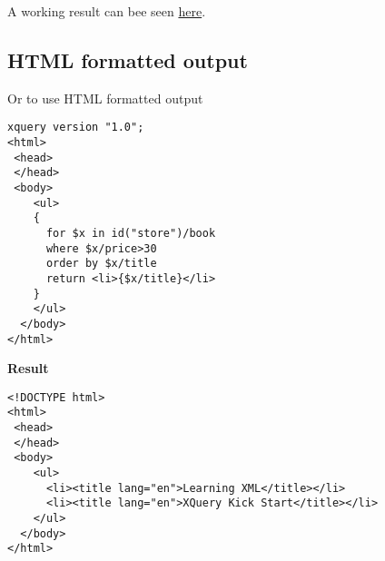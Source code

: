 A working result can bee seen \href{http://videlibri.sourceforge.net/cgi-bin/xidelcgi?&data=%3Cbookstore%20id%3D%22store%22%3E%20%20%0A%20%20%3Cbook%20category%3D%22COOKING%22%3E%0A%20%20%20%20%3Ctitle%20lang%3D%22en%22%3EEveryday%20Italian%3C%2Ftitle%3E%0A%20%20%20%20%3Cauthor%3EGiada%20De%20Laurentiis%3C%2Fauthor%3E%0A%20%20%20%20%3Cyear%3E2005%3C%2Fyear%3E%0A%20%20%20%20%3Cprice%3E30.00%3C%2Fprice%3E%0A%20%20%3C%2Fbook%3E%0A%20%20%20%20%3Cbook%20category%3D%22CHILDREN%22%3E%0A%20%20%20%20%3Ctitle%20lang%3D%22en%22%3EHarry%20Potter%3C%2Ftitle%3E%0A%20%20%20%20%3Cauthor%3EJ%20K.%20Rowling%3C%2Fauthor%3E%0A%20%20%20%20%3Cyear%3E2005%3C%2Fyear%3E%0A%20%20%20%20%3Cprice%3E29.99%3C%2Fprice%3E%0A%20%20%3C%2Fbook%3E%0A%20%20%3Cbook%20category%3D%22WEB%22%3E%0A%20%20%20%20%3Ctitle%20lang%3D%22en%22%3EXQuery%20Kick%20Start%3C%2Ftitle%3E%0A%20%20%20%20%3Cauthor%3EJames%20McGovern%3C%2Fauthor%3E%0A%20%20%20%20%3Cauthor%3EPer%20Bothner%3C%2Fauthor%3E%0A%20%20%20%20%3Cauthor%3EKurt%20Cagle%3C%2Fauthor%3E%0A%20%20%20%20%3Cauthor%3EJames%20Linn%3C%2Fauthor%3E%0A%20%20%20%20%3Cauthor%3EVaidyanathan%20Nagarajan%3C%2Fauthor%3E%0A%20%20%20%20%3Cyear%3E2003%3C%2Fyear%3E%0A%20%20%20%20%3Cprice%3E49.99%3C%2Fprice%3E%0A%20%20%3C%2Fbook%3E%0A%20%20%3Cbook%20category%3D%22WEB%22%3E%0A%20%20%20%20%3Ctitle%20lang%3D%22en%22%3ELearning%20XML%3C%2Ftitle%3E%0A%20%20%20%20%3Cauthor%3EErik%20T.%20Ray%3C%2Fauthor%3E%0A%20%20%20%20%3Cyear%3E2003%3C%2Fyear%3E%0A%20%20%20%20%3Cprice%3E39.95%3C%2Fprice%3E%0A%20%20%3C%2Fbook%3E%0A%3C%2Fbookstore%3E%20%0A&=&extract=xquery%20version%20%221.0%22%3B%0A%0A%0Adeclare%20function%20local%3Asearch(%24doc%20as%20element())%7B%0A%20for%20%24x%20in%20%24doc%2Fbook%0A%20%20where%20%24x%2Fprice%3E30%0A%20%20%20order%20by%20%24x%2Ftitle%0A%20%20return%20%24x%2Ftitle%0A%7D%3B%0A%0Alocal%3Asearch(id(%22store%22))&=&input-format=xml&printed-node-format=text&output-format=adhoc&compatibility=Enable%20all%20extensions&dot-notation=unambiguous&extract-kind=xquery1}{here}.
\newpage

\subsection{HTML formatted output}
Or to use HTML formatted output
\begin{lstlisting}[frame=single, style=htmlcssjs, caption={query with HTML output}]
xquery version "1.0";
<html>
 <head>
 </head>
 <body>
    <ul>
    {
      for $x in id("store")/book
      where $x/price>30
      order by $x/title
      return <li>{$x/title}</li>
    }
    </ul>
  </body>
</html>
\end{lstlisting}
\textbf{Result}
\begin{lstlisting}[frame=single, style=htmlcssjs, caption={result}]
<!DOCTYPE html>
<html>
 <head>
 </head>
 <body>
    <ul>
      <li><title lang="en">Learning XML</title></li>
      <li><title lang="en">XQuery Kick Start</title></li>
    </ul>
  </body>
</html>
\end{lstlisting}